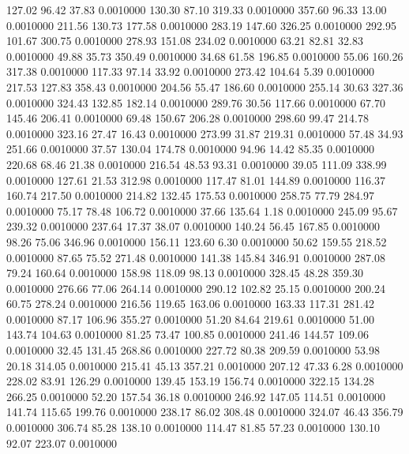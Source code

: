  127.02   96.42   37.83   0.0010000
 130.30   87.10  319.33   0.0010000
 357.60   96.33   13.00   0.0010000
 211.56  130.73  177.58   0.0010000
 283.19  147.60  326.25   0.0010000
 292.95  101.67  300.75   0.0010000
 278.93  151.08  234.02   0.0010000
  63.21   82.81   32.83   0.0010000
  49.88   35.73  350.49   0.0010000
  34.68   61.58  196.85   0.0010000
  55.06  160.26  317.38   0.0010000
 117.33   97.14   33.92   0.0010000
 273.42  104.64    5.39   0.0010000
 217.53  127.83  358.43   0.0010000
 204.56   55.47  186.60   0.0010000
 255.14   30.63  327.36   0.0010000
 324.43  132.85  182.14   0.0010000
 289.76   30.56  117.66   0.0010000
  67.70  145.46  206.41   0.0010000
  69.48  150.67  206.28   0.0010000
 298.60   99.47  214.78   0.0010000
 323.16   27.47   16.43   0.0010000
 273.99   31.87  219.31   0.0010000
  57.48   34.93  251.66   0.0010000
  37.57  130.04  174.78   0.0010000
  94.96   14.42   85.35   0.0010000
 220.68   68.46   21.38   0.0010000
 216.54   48.53   93.31   0.0010000
  39.05  111.09  338.99   0.0010000
 127.61   21.53  312.98   0.0010000
 117.47   81.01  144.89   0.0010000
 116.37  160.74  217.50   0.0010000
 214.82  132.45  175.53   0.0010000
 258.75   77.79  284.97   0.0010000
  75.17   78.48  106.72   0.0010000
  37.66  135.64    1.18   0.0010000
 245.09   95.67  239.32   0.0010000
 237.64   17.37   38.07   0.0010000
 140.24   56.45  167.85   0.0010000
  98.26   75.06  346.96   0.0010000
 156.11  123.60    6.30   0.0010000
  50.62  159.55  218.52   0.0010000
  87.65   75.52  271.48   0.0010000
 141.38  145.84  346.91   0.0010000
 287.08   79.24  160.64   0.0010000
 158.98  118.09   98.13   0.0010000
 328.45   48.28  359.30   0.0010000
 276.66   77.06  264.14   0.0010000
 290.12  102.82   25.15   0.0010000
 200.24   60.75  278.24   0.0010000
 216.56  119.65  163.06   0.0010000
 163.33  117.31  281.42   0.0010000
  87.17  106.96  355.27   0.0010000
  51.20   84.64  219.61   0.0010000
  51.00  143.74  104.63   0.0010000
  81.25   73.47  100.85   0.0010000
 241.46  144.57  109.06   0.0010000
  32.45  131.45  268.86   0.0010000
 227.72   80.38  209.59   0.0010000
  53.98   20.18  314.05   0.0010000
 215.41   45.13  357.21   0.0010000
 207.12   47.33    6.28   0.0010000
 228.02   83.91  126.29   0.0010000
 139.45  153.19  156.74   0.0010000
 322.15  134.28  266.25   0.0010000
  52.20  157.54   36.18   0.0010000
 246.92  147.05  114.51   0.0010000
 141.74  115.65  199.76   0.0010000
 238.17   86.02  308.48   0.0010000
 324.07   46.43  356.79   0.0010000
 306.74   85.28  138.10   0.0010000
 114.47   81.85   57.23   0.0010000
 130.10   92.07  223.07   0.0010000

